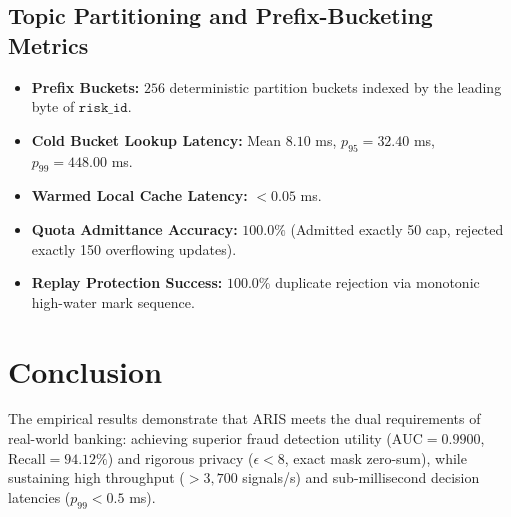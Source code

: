 \documentclass[conference]{IEEEtran}
\begin{document}
\subsection{Topic Partitioning and Prefix-Bucketing Metrics}
\begin{itemize}
    \item \textbf{Prefix Buckets:} $256$ deterministic partition buckets indexed by the leading byte of $\texttt{risk\_id}$.
    \item \textbf{Cold Bucket Lookup Latency:} Mean $8.10$ ms, $p_{95} = 32.40$ ms, $p_{99} = 448.00$ ms.
    \item \textbf{Warmed Local Cache Latency:} $< 0.05$ ms.
    \item \textbf{Quota Admittance Accuracy:} $100.0\%$ (Admitted exactly 50 cap, rejected exactly 150 overflowing updates).
    \item \textbf{Replay Protection Success:} $100.0\%$ duplicate rejection via monotonic high-water mark sequence.
\end{itemize}

\section{Conclusion}
The empirical results demonstrate that ARIS meets the dual requirements of real-world banking: achieving superior fraud detection utility ($\text{AUC} = 0.9900$, $\text{Recall} = 94.12\%$) and rigorous privacy ($\epsilon < 8$, exact mask zero-sum), while sustaining high throughput ($>3,700$ signals/s) and sub-millisecond decision latencies ($p_{99} < 0.5$ ms).
\end{document}
